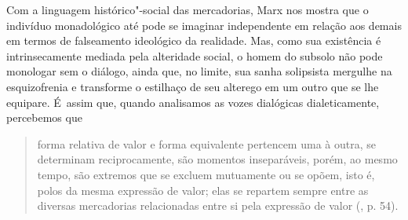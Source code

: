 {Com a linguagem histórico"-social das mercadorias, Marx nos mostra que o
indivíduo monadológico até pode se imaginar independente em relação aos
demais em termos de falseamento ideológico da realidade. Mas, como sua
existência é intrinsecamente mediada pela alteridade social, o homem do
subsolo não pode monologar sem o diálogo, ainda que, no limite, sua
sanha solipsista mergulhe na esquizofrenia e transforme o estilhaço de
seu alterego em um outro que se lhe equipare. É~assim que, quando
analisamos as vozes dialógicas dialeticamente, percebemos que

\begin{quote}
forma relativa de valor e forma equivalente pertencem uma à outra, se
determinam reciprocamente, são momentos inseparáveis, porém, ao mesmo
tempo, são extremos que se excluem mutuamente ou se opõem, isto é, polos
da mesma expressão de valor; elas se repartem sempre entre as diversas
mercadorias relacionadas entre si pela expressão de valor (, p. 54).
\end{quote}

}
